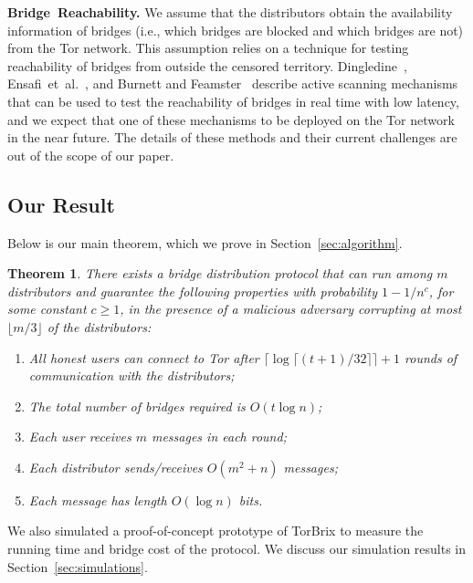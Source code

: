 \documentclass[letterpaper,twocolumn,10pt]{article}
\newcommand{\etal}{et~al.}
\newtheorem{theorem}{Theorem}
\newcommand{\sfsize}{\fontsize{0.73\baselineskip}{0.73\baselineskip}\selectfont}
\newcommand{\sans}[1]{\textsf{\sfsize \mbox{#1}}}
\newcommand{\sansb}[1]{\textbf{\sans{\mbox{#1}}}}
\newcommand{\para}[1]{\vspace{0.55em} \noindent \sansb{{\mbox{#1}}}}
\newcommand{\brix}{\sans{TorBrix}\xspace}
\begin{document}
\para{Bridge Reachability.} We assume that the distributors obtain the availability information of bridges (i.e., which bridges are blocked and which bridges are not) from the Tor network. This assumption relies on a technique for testing reachability of bridges from outside the censored territory. Dingledine~\cite{Dingledine:BridgeReach:2011}, Ensafi~\etal~\cite{Ensafi:2014:PAM}, and Burnett and Feamster~\cite{Burnett:2015:ELM} describe active scanning mechanisms that can be used to test the reachability of bridges in real time with low latency, and we expect that one of these mechanisms to be deployed on the Tor network in the near future. The details of these methods and their current challenges are out of the scope of our paper.

\subsection{Our Result} \label{sec:results}
\noindent Below is our main theorem, which we prove in Section~\ref{sec:algorithm}.
\begin{theorem}
	\label{thm:main} There exists a bridge distribution protocol that can run among $m$ distributors and guarantee the following properties with probability ${1 - 1/n^c}$, for some constant ${c \geq 1}$, in the presence of a malicious adversary corrupting at most $\lfloor m/3 \rfloor$ of the distributors: %
	\begin{enumerate}[itemsep=-0.25em,topsep=0.5em]
		\item All honest users can connect to Tor after ${\lceil \log{\lceil (t+1)/32 \rceil} \rceil + 1}$ rounds of communication with the distributors;
		\item The total number of bridges required is $O(t\log{n})$;
		\item Each user receives $m$ messages in each round;
		\item Each distributor sends/receives $O(m^2 + n)$ messages;
		\item Each message has length $O(\log{n})$ bits.
	\end{enumerate}
\end{theorem}

We also simulated a proof-of-concept prototype of \brix to measure the running time and bridge cost of the protocol. We discuss our simulation results in Section~\ref{sec:simulations}.

\end{document}
